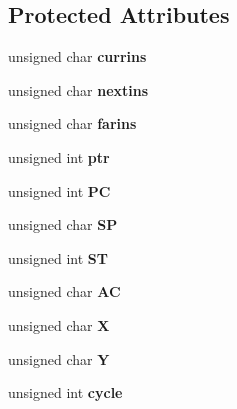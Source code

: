 \subsection*{Protected Attributes}
\begin{DoxyCompactItemize}
\item 
\mbox{\label{class_c_p_u_a3299feb9c8d08ceef5993d4dea43d886}} 
unsigned char {\bfseries currins}
\item 
\mbox{\label{class_c_p_u_a3ce83df02f56f18bd02798261c18e104}} 
unsigned char {\bfseries nextins}
\item 
\mbox{\label{class_c_p_u_add91a947112960600127e2f49231a182}} 
unsigned char {\bfseries farins}
\item 
\mbox{\label{class_c_p_u_ad961a49d855a1d7bc4038964bcc8112f}} 
unsigned int {\bfseries ptr}
\item 
\mbox{\label{class_c_p_u_a0d8e2d9c649ab1807286bd4f159204aa}} 
unsigned int {\bfseries PC}
\item 
\mbox{\label{class_c_p_u_ad8850d2897da737420defff91f51dc63}} 
unsigned char {\bfseries SP}
\item 
\mbox{\label{class_c_p_u_aa62ee7357fbeff64b4ae5fa7c9e857a6}} 
unsigned int {\bfseries ST}
\item 
\mbox{\label{class_c_p_u_a0fba29ee69b43336358eb2625af1aea4}} 
unsigned char {\bfseries AC}
\item 
\mbox{\label{class_c_p_u_a1c03f1fcdb68fd2128f3e9cc589897cf}} 
unsigned char {\bfseries X}
\item 
\mbox{\label{class_c_p_u_ad4265738a75b1b43572c498a5fd20599}} 
unsigned char {\bfseries Y}
\item 
\mbox{\label{class_c_p_u_a04671e55a6751a3fe572330ebef97203}} 
unsigned int {\bfseries cycle}
\item 
\mbox{\label{class_c_p_u_a3b1f1d8f6539bb5bf799b85497c337db}} 

\end{DoxyCompactItemize}
